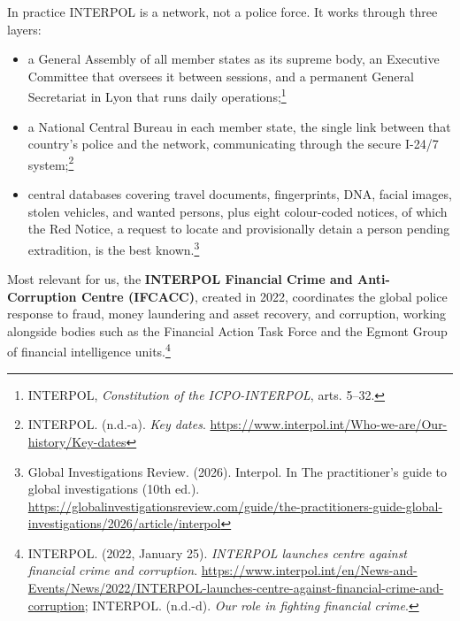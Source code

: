 In practice INTERPOL is a network, not a police force. It works through three layers:

\begin{itemize}
  \item a General Assembly of all member states as its supreme body, an Executive Committee that oversees it between sessions, and a permanent General Secretariat in Lyon that runs daily operations;\footnote{INTERPOL, \emph{Constitution of the ICPO-INTERPOL}, arts. 5–32.}
  \item a National Central Bureau in each member state, the single link between that country’s police and the network, communicating through the secure I-24/7 system;\footnote{INTERPOL. (n.d.-a). \emph{Key dates}. \url{https://www.interpol.int/Who-we-are/Our-history/Key-dates}}
  \item central databases covering travel documents, fingerprints, DNA, facial images, stolen vehicles, and wanted persons, plus eight colour-coded notices, of which the Red Notice, a request to locate and provisionally detain a person pending extradition, is the best known.\footnote{Global Investigations Review. (2026). Interpol. In The practitioner’s guide to global investigations (10th ed.). \url{https://globalinvestigationsreview.com/guide/the-practitioners-guide-global-investigations/2026/article/interpol}}
\end{itemize}

Most relevant for us, the \textbf{INTERPOL Financial Crime and Anti-Corruption Centre (IFCACC)}, created in 2022, coordinates the global police response to fraud, money laundering and asset recovery, and corruption, working alongside bodies such as the Financial Action Task Force and the Egmont Group of financial intelligence units.\footnote{INTERPOL. (2022, January 25). \emph{INTERPOL launches centre against financial crime and corruption}. \url{https://www.interpol.int/en/News-and-Events/News/2022/INTERPOL-launches-centre-against-financial-crime-and-corruption}; INTERPOL. (n.d.-d). \emph{Our role in fighting financial crime}.}


